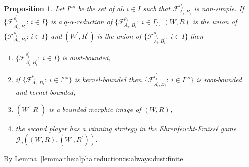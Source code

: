 \documentclass[draft]{article}
\newtheorem{proposition}{Proposition}
\newenvironment{proof}{{\bf Proof:}}{~$\dashv$\\}
\begin{document}
\begin{proposition}\label{lemma:good:properties:of:alpha:reductions:indexed}
%
%
Let $I^{ns}$ be the set of all $i{\in}I$ such that ${\mathcal F}_{A_{i},B_{i}}^{\rho_{i}}$ is non-simple.
If $\{{\mathcal F}_{A_{i}^{\prime},B_{i}^{\prime}}^{\rho_{i}^{\prime}}:\ i{\in}I\}$ is a $q$-$\alpha$-reduction of $\{{\mathcal F}_{A_{i},B_{i}}^{\rho_{i}}:\ i{\in}I\}$, $(W,R)$ is the union of $\{{\mathcal F}_{A_{i},B_{i}}^{\rho_{i}}:\ i{\in}I\}$ and $(W^{\prime},R^{\prime})$ is the union of $\{{\mathcal F}_{A_{i}^{\prime},B_{i}^{\prime}}^{\rho_{i}^{\prime}}:\ i{\in}I\}$ then
%
%
\begin{enumerate}
%
%
\item $\{{\mathcal F}_{A_{i}^{\prime},B_{i}^{\prime}}^{\rho_{i}^{\prime}}:\ i{\in}I\}$ is dust-bounded,
%
%
\item if $\{{\mathcal F}_{A_{i},B_{i}}^{\rho_{i}}:\ i{\in}I^{ns}\}$ is kernel-bounded then $\{{\mathcal F}_{A_{i}^{\prime},B_{i}^{\prime}}^{\rho_{i}^{\prime}}:\ i{\in}I^{ns}\}$ is root-bounded and kernel-bounded,
%
%
\item $(W^{\prime},R^{\prime})$ is a bounded morphic image of $(W,R)$,
%
%
\item the second player has a winning strategy in the Ehrenfeucht-Fra\"\i ss\'e game ${\mathcal G}_{q}((W,R),(W^{\prime},R^{\prime}))$.
%
%
\end{enumerate}
%
%
\end{proposition}
%
%
\begin{proof}
%
%
By Lemma~\ref{lemma:the:alpha:reduction:is:always:dust:finite}.
%
%
\medskip
%
%
\end{proof}
%
%
%
%
\end{document}
